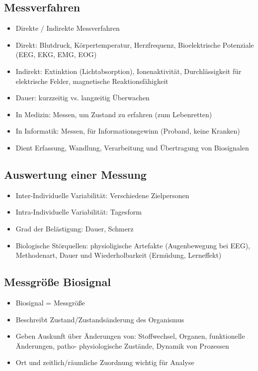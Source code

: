 \documentclass[a4paper,10pt,oneside]{article}
\begin{document}
\subsection{Messverfahren}
\begin{itemize}
	\item Direkte / Indirekte Messverfahren
	\item Direkt: Blutdruck, Körpertemperatur, Herzfrequenz, Bioelektrische Potenziale (EEG, EKG, EMG, EOG)
	\item Indirekt: Extinktion (Lichtabsorption), Ionenaktivität, Durchlässigkeit für elektrische Felder, magnetische Reaktionsfähigkeit
	\item Dauer: kurzzeitig vs. langzeitig Überwachen
	\item In Medizin: Messen, um Zustand zu erfahren (zum Lebenretten)
	\item In Informatik: Messen, für Informationsgewinn (Proband, keine Kranken)
	\item Dient Erfassung, Wandlung, Verarbeitung und Übertragung von Biosignalen
\end{itemize}
	
\subsection{Auswertung einer Messung}
\begin{itemize}
	\item Inter-Individuelle Variabilität: Verschiedene Zielpersonen
	\item Intra-Individuelle Variabilität: Tagesform
	\item Grad der Belästigung: Dauer, Schmerz
	\item Biologische Störquellen: physioligische Artefakte (Augenbewegung bei EEG), Methodenart, Dauer und Wiederholbarkeit (Ermüdung, Lerneffekt)
\end{itemize}

\subsection{Messgröße Biosignal}
\begin{itemize}
	\item Biosignal = Messgröße
	\item Beschreibt Zustand/Zustandsänderung des Organismus
	\item Geben Auskunft über Änderungen von: Stoffwechsel, Organen, funktionelle Änderungen, patho- physiologische Zustände, Dynamik von Prozessen
	\item Ort und zeitlich/räumliche Zuordnung wichtig für Analyse
\end{itemize}
\end{document}
